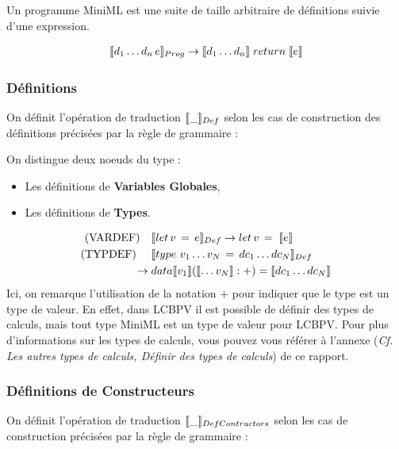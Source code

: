 \documentclass[12pt]{article}
\begin{document}
Un programme MiniML est une suite de taille arbitraire de définitions suivie d'une expression.

\begin{align*}
      \llbracket d_1 \dots d_n \, e \rrbracket_{Prog} \rightarrow \llbracket d_1 \dots d_n \rrbracket\; return \; \llbracket e \rrbracket
\end{align*}

\subsubsection*{Définitions}\label{def}

On définit l'opération de traduction \(\llbracket \_ \rrbracket_{Def}\) selon les cas de construction
des définitions précisées par la règle de grammaire : 

On distingue deux noeuds du type :
\begin{itemize}
      \tightlist
      \item
            Les définitions de \textbf{Variables Globales},
      \item
            Les définitions de \textbf{Types}.
\end{itemize}
\begin{align*}
      \text{(VARDEF)}  \quad & \llbracket let \, v \, = \, e \rrbracket_{Def} \rightarrow   let \, v \, = \; \llbracket e \rrbracket       \\
      \text{(TYPDEF) } \quad & \llbracket type \, \, v_1 \dots v_N \, = \, dc_1 \dots  dc_N \rrbracket_{Def}                           \\
      \rightarrow \;         & data \llbracket v_1 \rrbracket (\llbracket \dots v_N \rrbracket : +) = \llbracket dc_1 \dots dc_N \rrbracket \\
\end{align*}
Ici, on remarque l'utilisation de la notation $+$ pour indiquer que le type est un type de valeur.
En effet, dans LCBPV il est possible de définir des types de calculs, mais tout type MiniML est un type de valeur pour LCBPV.
Pour plus d'informations sur les types de calculs, vous pouvez vous référer à l'annexe (\textit{Cf. Les autres types de calculs, Définir des types de calculs}) de ce rapport.

\subsubsection*{Définitions de Constructeurs}\label{defConstruct}

On définit l'opération de traduction \(\llbracket \_ \rrbracket_{DefContructors}\) selon les cas de construction précisées par la règle de grammaire : 
\end{document}
